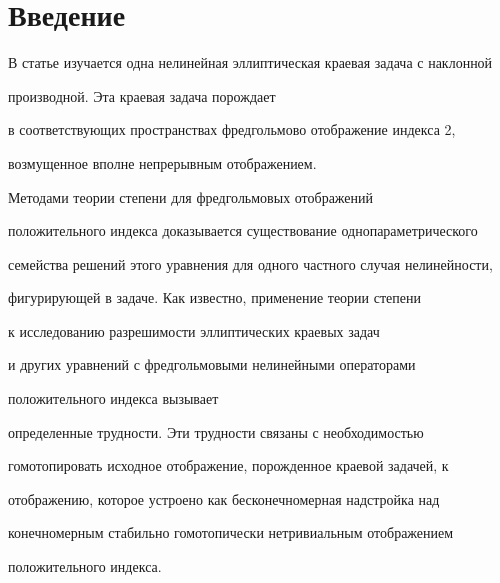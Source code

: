 \date{}




\pagestyle{plain} %







\maketitle


\label{begin}





\section{Введение}





В статье изучается одна нелинейная эллиптическая краевая задача с наклонной 


производной. Эта краевая задача порождает


в соответствующих пространствах фредгольмово отображение индекса 2,


возмущенное вполне непрерывным отображением.


Методами теории степени для фредгольмовых отображений 


положительного индекса доказывается существование однопараметрического


семейства решений этого уравнения для одного частного случая нелинейности,


фигурирующей в задаче. Как известно, применение теории степени 


к исследованию разрешимости эллиптических краевых задач 


и других уравнений с фредгольмовыми нелинейными операторами


положительного индекса вызывает


определенные трудности. Эти трудности связаны с необходимостью 


гомотопировать исходное отображение, порожденное краевой задачей, к


отображению, которое устроено как бесконечномерная надстройка над


конечномерным стабильно гомотопически нетривиальным отображением 


положительного индекса.


